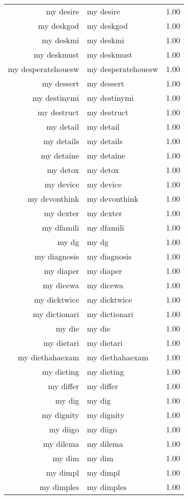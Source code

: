 \begin{table}[ht]
\begin{tabular}{rlr}
  my desire & my desire & 1.00 \\ 
  my deskgod & my deskgod & 1.00 \\ 
  my deskmi & my deskmi & 1.00 \\ 
  my deskmust & my deskmust & 1.00 \\ 
  my desperatehouesw & my desperatehouesw & 1.00 \\ 
  my dessert & my dessert & 1.00 \\ 
  my destinymi & my destinymi & 1.00 \\ 
  my destruct & my destruct & 1.00 \\ 
  my detail & my detail & 1.00 \\ 
  my details & my details & 1.00 \\ 
  my detaine & my detaine & 1.00 \\ 
  my detox & my detox & 1.00 \\ 
  my device & my device & 1.00 \\ 
  my devonthink & my devonthink & 1.00 \\ 
  my dexter & my dexter & 1.00 \\ 
  my dfamili & my dfamili & 1.00 \\ 
  my dg & my dg & 1.00 \\ 
  my diagnosis & my diagnosis & 1.00 \\ 
  my diaper & my diaper & 1.00 \\ 
  my dicewa & my dicewa & 1.00 \\ 
  my dicktwice & my dicktwice & 1.00 \\ 
  my dictionari & my dictionari & 1.00 \\ 
  my die & my die & 1.00 \\ 
  my dietari & my dietari & 1.00 \\ 
  my diethahaexam & my diethahaexam & 1.00 \\ 
  my dieting & my dieting & 1.00 \\ 
  my differ & my differ & 1.00 \\ 
  my dig & my dig & 1.00 \\ 
  my dignity & my dignity & 1.00 \\ 
  my diigo & my diigo & 1.00 \\ 
  my dilema & my dilema & 1.00 \\ 
  my dim & my dim & 1.00 \\ 
  my dimpl & my dimpl & 1.00 \\ 
  my dimples & my dimples & 1.00 \\ 

\end{tabular}
\end{table}
